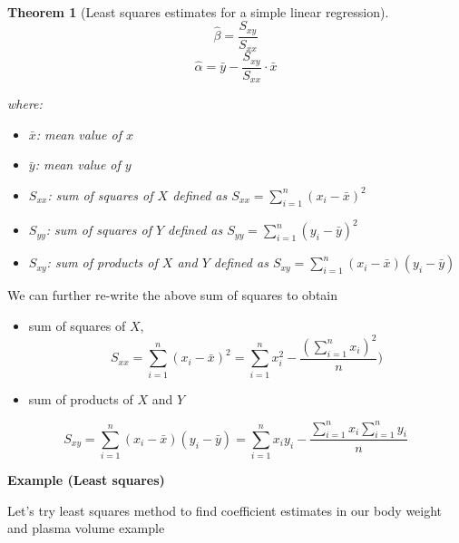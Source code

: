 \documentclass[
]{book}
\providecommand{\tightlist}{%
  \setlength{\itemsep}{0pt}\setlength{\parskip}{0pt}}
\newtheorem{theorem}{Theorem}[chapter]
\theoremstyle{definition}
\theoremstyle{definition}
\theoremstyle{definition}
\theoremstyle{remark}
\begin{document}
~\\
\begin{theorem}[Least squares estimates for a simple linear regression]
\protect\hypertarget{thm:leastsq-01}{}{\label{thm:leastsq-01} {} }
\[\hat{\beta} = \frac{S_{xy}}{S_{xx}}\]
\[\hat{\alpha} = \bar{y}-\frac{S_{xy}}{S_{xx}}\cdot \bar{x}\]

where:

\begin{itemize}
\tightlist
\item
  \(\bar{x}\): mean value of \(x\)
\item
  \(\bar{y}\): mean value of \(y\)
\item
  \(S_{xx}\): sum of squares of \(X\) defined as \(S_{xx} = \displaystyle \sum_{i=1}^{n}(x_i-\bar{x})^2\)
\item
  \(S_{yy}\): sum of squares of \(Y\) defined as \(S_{yy} = \displaystyle \sum_{i=1}^{n}(y_i-\bar{y})^2\)
\item
  \(S_{xy}\): sum of products of \(X\) and \(Y\) defined as \(S_{xy} = \displaystyle \sum_{i=1}^{n}(x_i-\bar{x})(y_i-\bar{y})\)
\end{itemize}
\end{theorem}

We can further re-write the above sum of squares to obtain

\begin{itemize}
\tightlist
\item
  sum of squares of \(X\), \[S_{xx} = \displaystyle \sum_{i=1}^{n}(x_i-\bar{x})^2 = \sum_{i=1}^{n}x_i^2-\frac{(\sum_{i=1}^{n}x_i)^2}{n})\]
\item
  sum of products of \(X\) and \(Y\)
\end{itemize}

\[S_{xy} = \displaystyle \sum_{i=1}^{n}(x_i-\bar{x})(y_i-\bar{y})=\sum_{i=1}^nx_iy_i-\frac{\sum_{i=1}^{n}x_i\sum_{i=1}^{n}y_i}{n}\]

\textbf{Example (Least squares)}

Let's try least squares method to find coefficient estimates in our body weight and plasma volume example
\end{document}
